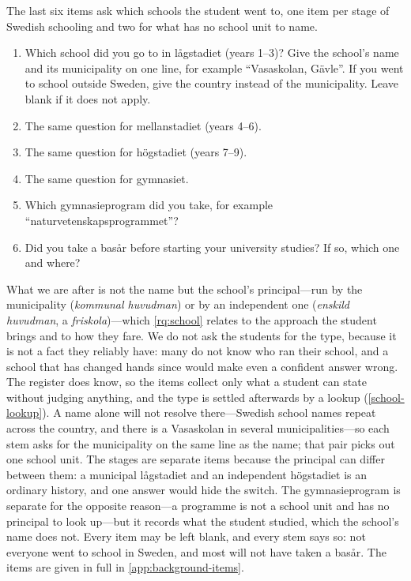 The last six items ask which schools the student went to, one item per
stage of Swedish schooling and two for what has no school unit to name.
\begin{enumerate}[resume]
  \item Which school did you go to in lågstadiet (years 1--3)?
    Give the school's name and its municipality on one line, for
    example \enquote{Vasaskolan, Gävle}.
    If you went to school outside Sweden, give the country instead of
    the municipality.
    Leave blank if it does not apply.
  \item The same question for mellanstadiet (years 4--6).
  \item The same question for högstadiet (years 7--9).
  \item The same question for gymnasiet.
  \item Which gymnasieprogram did you take, for example
    \enquote{naturvetenskapsprogrammet}?
  \item Did you take a basår before starting your university studies?
    If so, which one and where?
\end{enumerate}
What we are after is not the name but the school's principal---run by
the municipality (\emph{kommunal huvudman}) or by an independent one
(\emph{enskild huvudman}, a \emph{friskola})---which \cref{rq:school}
relates to the approach the student brings and to how they fare.
We do not ask the students for the type, because it is not a fact they
reliably have: many do not know who ran their school, and a school that
has changed hands since would make even a confident answer wrong.
The register does know, so the items collect only what a student can
state without judging anything, and the type is settled afterwards by a
lookup (\cref{school-lookup}).
A name alone will not resolve there---Swedish school names repeat across
the country, and there is a Vasaskolan in several municipalities---so
each stem asks for the municipality on the same line as the name; that
pair picks out one school unit.
The stages are separate items because the principal can differ between
them: a municipal lågstadiet and an independent högstadiet is an
ordinary history, and one answer would hide the switch.
The gymnasieprogram is separate for the opposite reason---a programme is
not a school unit and has no principal to look up---but it records what
the student studied, which the school's name does not.
Every item may be left blank, and every stem says so: not everyone went
to school in Sweden, and most will not have taken a basår.
The items are given in full in \cref{app:background-items}.

